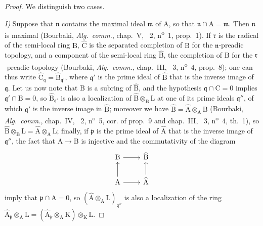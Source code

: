 \begin{proof}
We distinguish two cases.

\emph{I)} Suppose that $\mathfrak{n}$ contains the maximal ideal $\mathfrak{m}$ of $\mathrm{A}$, so that $\mathfrak{n}\cap\mathrm{A}=\mathfrak{m}$.
Then $\mathfrak{n}$ is maximal (Bourbaki, \emph{Alg.~comm.}, chap.~V, \textsection~2, n\textsuperscript{o}~1, prop.~1).
If $\mathfrak{r}$ is the radical of the semi-local ring $\mathrm{B}$, $\widehat{\mathrm{C}}$ is the separated completion of $\mathrm{B}$ for the $\mathfrak{n}$-preadic topology, and a component of the semi-local ring $\widehat{\mathrm{B}}$, the completion of $\mathrm{B}$ for the $\mathfrak{r}$-preadic topology (Bourbaki, \emph{Alg.~comm.}, chap.~III, \textsection~3, n\textsuperscript{o}~4, prop.~8);
one can thus write $\widehat{\mathrm{C}}_\mathfrak{q}=\widehat{\mathrm{B}}_{\mathfrak{q}'}$, where $\mathfrak{q}'$ is the prime ideal of $\widehat{\mathrm{B}}$ that is the inverse image of $\mathfrak{q}$.
Let us now note that $\mathrm{B}$ is a subring of $\widehat{\mathrm{B}}$, and the hypothesis $\mathfrak{q}\cap\mathrm{C}=0$ implies $\mathfrak{q}'\cap\mathrm{B}=0$, so $\widehat{\mathrm{B}}_{\mathfrak{q}'}$ is also a localization of $\widehat{\mathrm{B}}\otimes_\mathrm{B}\mathrm{L}$ at one of its prime ideals $\mathfrak{q}''$, of which $\mathfrak{q}'$ is the inverse image in $\widehat{\mathrm{B}}$;
moreover we have $\widehat{\mathrm{B}}=\widehat{\mathrm{A}}\otimes_\mathrm{A}\mathrm{B}$ (Bourbaki, \emph{Alg.~comm.}, chap.~IV, \textsection~2, n\textsuperscript{o}~5, cor. of prop.~9 and chap.~III, \textsection~3, n\textsuperscript{o}~4, th.~1), so $\widehat{\mathrm{B}}\otimes_\mathrm{B}\mathrm{L}=\widehat{\mathrm{A}}\otimes_\mathrm{A}\mathrm{L}$; finally, if $\mathfrak{p}$ is the prime ideal of $\widehat{\mathrm{A}}$ that is the inverse image of $\mathfrak{q}''$, the fact that $\mathrm{A}\to\mathrm{B}$ is injective and the commutativity of the diagram
\[
  \begin{tikzcd}
    \mathrm{B} \ar[r] & \widehat{\mathrm{B}}\\
    \mathrm{A} \ar[u] \ar[r] & \widehat{\mathrm{A}} \ar[u]
  \end{tikzcd}
\]
imply that $\mathfrak{p}\cap\mathrm{A}=0$, so $(\widehat{\mathrm{A}}\otimes_\mathrm{A}\mathrm{L})_{\mathfrak{q}''}$ is also a localization of the ring $\widehat{\mathrm{A}}_\mathfrak{p}\otimes_\mathrm{A}\mathrm{L}=(\widehat{\mathrm{A}}_\mathfrak{p}\otimes_\mathrm{A}\mathrm{K})\otimes_\mathrm{K}\mathrm{L}$.



\end{proof}
